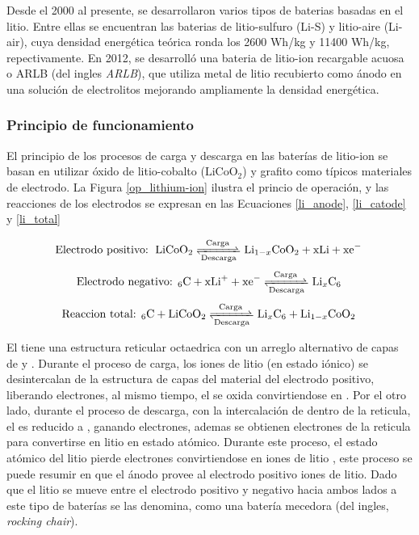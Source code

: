 \documentclass[10pt,a4paper]{article}
\newcommand\reaction[1]{\begin{equation}\ce{#1}\end{equation}}
\begin{document}
\noindent Desde el 2000 al presente, se desarrollaron varios tipos de baterias
basadas en el litio. Entre ellas se encuentran las baterias de litio-sulfuro
(Li-S) y litio-aire (Li-air), cuya densidad energética teórica ronda los 2600
Wh/kg y 11400 Wh/kg, repectivamente. En 2012, se desarrolló una bateria de
litio-ion recargable acuosa o \acrshort{ARLB} (del ingles
\emph{\acrlong{ARLB}}), que utiliza metal de litio recubierto como ánodo en una
solución de electrolitos mejorando ampliamente la densidad energética.

\subsubsection{Principio de funcionamiento}

El principio de los procesos de carga y descarga en las baterías de litio-ion se
basan en utilizar óxido de litio-cobalto ($\mathrm{LiCoO_2}$) y grafito como
típicos materiales de electrodo. La Figura \ref{op_lithium-ion} ilustra el
princio de operación, y las reacciones de los electrodos se expresan en  las
Ecuaciones \ref{li_anode}, \ref{li_catode} y \ref{li_total}

\reaction{\text{Electrodo positivo: } LiCoO2 <=>[Carga][Descarga] Li_{1-x}CoO2 + xLi + xe^- \label{li_anode}}
\reaction{\text{Electrodo negativo: }6C + xLi^+ + xe^- <=>[Carga][Descarga] Li_{x}C6 \label{li_catode}}
\reaction{\text{Reaccion total: }6C + LiCoO2 <=>[Carga][Descarga] Li_{x}C6 + Li_{1-x}CoO2 \label{li_total}}

\noindent El  tiene una estructura reticular octaedrica con un
arreglo alternativo de capas de  y . Durante el proceso de
carga, los iones de litio (en estado iónico) se desintercalan de la estructura
de capas del material del electrodo positivo, liberando electrones, al mismo
tiempo, el  se oxida convirtiendose en .  Por el otro
lado, durante el proceso de descarga, con la intercalación de  dentro de
la reticula, el  es reducido a , ganando electrones,
ademas se obtienen electrones de la reticula para convertirse en litio en estado
atómico. Durante este proceso, el estado atómico del litio pierde electrones
convirtiendose en iones de litio , este proceso se puede resumir en que el ánodo
provee al electrodo positivo iones de litio. Dado que el litio se mueve entre el
electrodo positivo y negativo hacia ambos lados a este tipo de baterías se las
denomina, como una batería mecedora (del ingles, \emph{rocking chair}).
\end{document}
